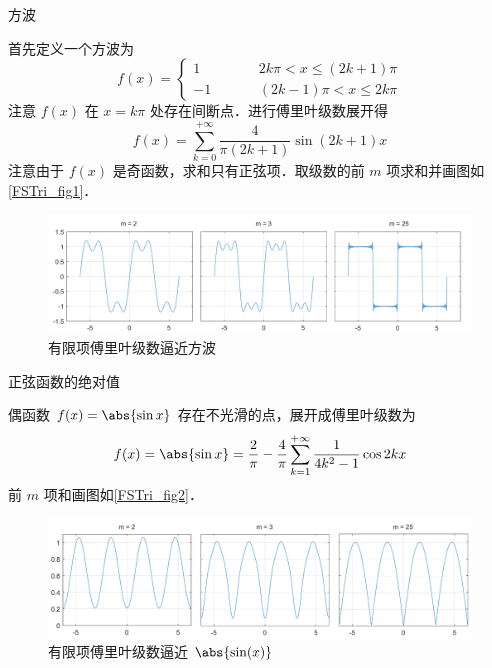 
\begin{exam}{方波}

首先定义一个方波为
\begin{equation}
f(x) = \left\{ \begin{aligned}
1& \quad && 2k\pi < x \le (2k + 1)\pi \\
- 1& &&   (2k - 1)\pi < x \le 2k\pi 
\end{aligned}\right.
\end{equation}
注意 $f(x)$ 在 $x=k\pi$ 处存在间断点．进行傅里叶级数展开得
\begin{equation}
f(x) = \sum\limits_{k = 0}^{ + \infty } {\frac{4}{{\pi (2k + 1)}}\sin (2k + 1)x}
\end{equation}
注意由于 $f(x)$ 是奇函数，求和只有正弦项．取级数的前 $m$ 项求和并画图如\autoref{FSTri_fig1}．

\begin{figure}[ht]
\centering
\includegraphics[width=14.5cm]{./figures/FSTri1.pdf}
\caption{有限项傅里叶级数逼近方波}\label{FSTri_fig1}
\end{figure}
\end{exam}

\begin{exam}{正弦函数的绝对值} %

偶函数 $f(x) = \abs{\sin x}$ 存在不光滑的点，展开成傅里叶级数为
\begin{equation}
f(x) = \abs{\sin x} = \frac{2}{\pi } - \frac{4}{\pi }\sum\limits_{k = 1}^{ + \infty } {\frac{1}{{4{k^2} - 1}}\cos 2k} x
\end{equation}
前 $m$ 项和画图如\autoref{FSTri_fig2}．
\begin{figure}[ht]
\centering
\includegraphics[width=14.5cm]{./figures/FSTri2.pdf}
\caption{有限项傅里叶级数逼近 $\abs{\sin(x)}$}\label{FSTri_fig2}
\end{figure}
\end{exam}


